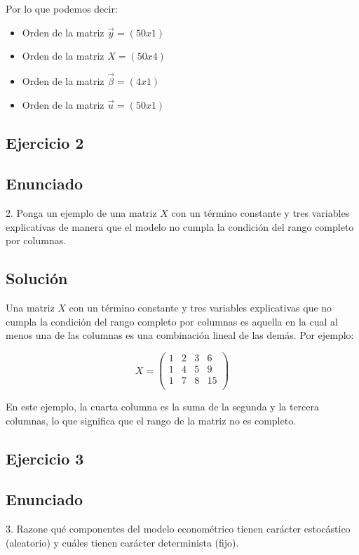 \documentclass[a4paper,12pt]{article}
\begin{document}
Por lo que podemos decir:
\begin{itemize}
    \item Orden de la matriz $ \vec{y} = (50 x 1)$
    \item Orden de la matriz $ X = (50 x 4)$
    \item Orden de la matriz $ \vec{\beta} = (4 x 1)$
    \item Orden de la matriz $ \vec{u} = (50 x 1)$
\end{itemize}

\subsection{Ejercicio 2}
\subsection*{Enunciado}
2. Ponga un ejemplo de una matriz \( X \) con un término constante y tres variables explicativas de manera que el modelo no cumpla la condición del rango completo por columnas.

\subsection*{Solución}
Una matriz \( X \) con un término constante y tres variables explicativas que no cumpla la condición del rango completo por columnas es aquella en la cual al menos una de las columnas es una combinación lineal de las demás. Por ejemplo:



\[ 
X = \begin{pmatrix}
1 & 2 & 3 & 6 \\
1 & 4 & 5 & 9 \\
1 & 7 & 8 & 15 \\
\end{pmatrix}
\]



En este ejemplo, la cuarta columna es la suma de la segunda y la tercera columnas, lo que significa que el rango de la matriz no es completo.

\subsection{Ejercicio 3}
\subsection*{Enunciado}
3. Razone qué componentes del modelo econométrico tienen carácter estocástico (aleatorio) y cuáles tienen carácter determinista (fijo).
\end{document}

